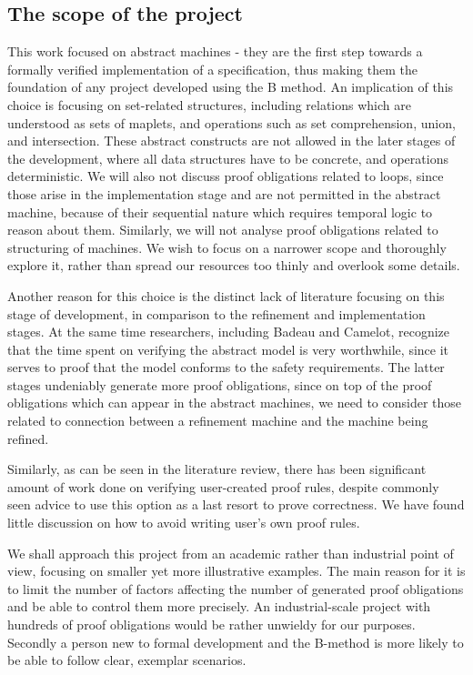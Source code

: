 \documentclass[12pt,journal,duplex]{IEEEtran}
\begin{document}
	\subsection{The scope of the project}
	This work focused on abstract machines - they are the first step towards a formally verified implementation of a specification, thus making them the foundation of any project developed using the B method. An implication of this choice is focusing on set-related structures, including relations which are understood as sets of maplets, and operations such as set comprehension, union, and intersection. These abstract constructs are not allowed in the later stages of the development, where all data structures have to be concrete, and operations deterministic. We will also not discuss proof obligations related to loops, since those arise in the implementation stage and are not permitted in the abstract machine, because of their sequential nature which requires temporal logic to reason about them. Similarly, we will not analyse proof obligations related to structuring of machines. We wish to focus on a narrower scope and thoroughly explore it, rather than spread our resources too thinly and overlook some details.

	Another reason for this choice is the distinct lack of literature focusing on this stage of development, in comparison to the refinement and implementation stages. At the same time researchers, including Badeau and Camelot, recognize that the time spent on verifying the abstract model is very worthwhile, since it serves to proof that the model conforms to the safety requirements\cite{airport shuttle}. The latter stages undeniably generate more proof obligations, since on top of the proof obligations which can appear in the abstract machines, we need to consider those related to connection between a refinement machine and the machine being refined.

	Similarly, as can be seen in the literature review, there has been significant amount of work done on verifying user-created proof rules, despite commonly seen advice to use this option as a last resort to prove correctness. We have found little discussion on how to avoid writing user's own proof rules.

	We shall approach this project from an academic rather than industrial point of view, focusing on smaller yet more illustrative examples. The main reason for it is to limit the number of factors affecting the number of generated proof obligations and be able to control them more precisely. An industrial-scale project with hundreds of proof obligations would be rather unwieldy for our purposes. Secondly a person new to formal development and the B-method is more likely to be able to follow clear, exemplar scenarios.
\end{document}
